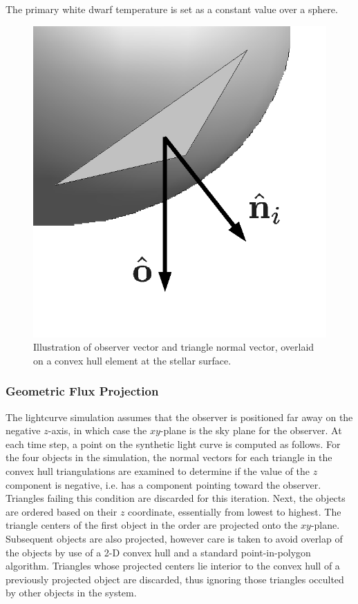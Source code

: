\documentclass[preprint2]{aastex}
\begin{document}
The primary white dwarf temperature is set as a constant value over a
sphere.

\begin{figure}[t]
   \centering
   \includegraphics[scale=0.6]{./vectors.eps}
   \caption{Illustration of observer vector and triangle normal 
   vector, overlaid on a convex hull element at the stellar surface.}
   \label{vecfig}
\end{figure}

\subsubsection{Geometric Flux Projection}
\label{sec:geomFlux}
The lightcurve simulation assumes that the observer is positioned far away on the
negative $z$-axis, in which case the $xy$-plane is the sky plane for the observer.  At each time step, a point on the synthetic light
curve is computed as follows.  For the four objects in the simulation,
the normal vectors for each triangle in the convex hull triangulations
are examined to determine if the value of the $z$ component is
negative, i.e. has a component pointing toward the observer.
Triangles failing this condition are discarded for this iteration.
Next, the objects are ordered based on their $z$ coordinate,
essentially from lowest to highest.  The triangle centers of the first
object in the order are projected onto the $xy$-plane.  Subsequent
objects are also projected, however care is taken to avoid overlap of
the objects by use of a 2-D convex hull and a standard
point-in-polygon algorithm.  Triangles whose projected centers lie
interior to the convex hull of a previously projected object are
discarded, thus ignoring those triangles occulted by other objects in
the system.
\end{document}
